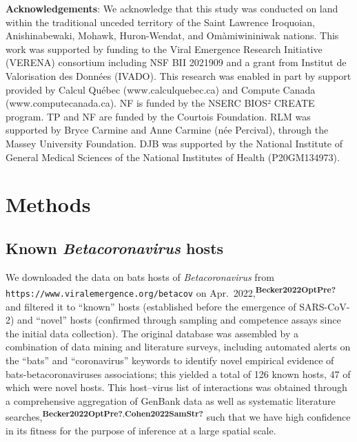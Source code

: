 \documentclass[10pt,oneside]{article}
\begin{document}
\textbf{Acknowledgements}: We acknowledge that this study was conducted
on land within the traditional unceded territory of the Saint Lawrence
Iroquoian, Anishinabewaki, Mohawk, Huron-Wendat, and Omàmiwininiwak
nations. This work was supported by funding to the Viral Emergence
Research Initiative (VERENA) consortium including NSF BII 2021909 and a
grant from Institut de Valorisation des Données (IVADO). This research
was enabled in part by support provided by Calcul Québec
(www.calculquebec.ca) and Compute Canada (www.computecanada.ca). NF is
funded by the NSERC BIOS² CREATE program. TP and NF are funded by the
Courtois Foundation. RLM was supported by Bryce Carmine and Anne Carmine
(née Percival), through the Massey University Foundation. DJB was
supported by the National Institute of General Medical Sciences of the
National Institutes of Health (P20GM134973).

\newpage

\hypertarget{methods}{%
\section{Methods}\label{methods}}

\hypertarget{known-betacoronavirus-hosts}{%
\subsection{\texorpdfstring{Known \emph{Betacoronavirus}
hosts}{Known Betacoronavirus hosts}}\label{known-betacoronavirus-hosts}}

We downloaded the data on bats hosts of \emph{Betacoronavirus} from
\texttt{https://www.viralemergence.org/betacov} on
Apr.~2022,\textsuperscript{\textbf{Becker2022OptPre?}} and filtered it
to ``known'' hosts (established before the emergence of SARS-CoV-2) and
``novel'' hosts (confirmed through sampling and competence assays since
the initial data collection). The original database was assembled by a
combination of data mining and literature surveys, including automated
alerts on the ``bats'' and ``coronavirus'' keywords to identify novel
empirical evidence of bats-betacoronaviruses associations; this yielded
a total of 126 known hosts, 47 of which were novel hosts. This
host--virus list of interactions was obtained through a comprehensive
aggregation of GenBank data as well as systematic literature
searches,\textsuperscript{\textbf{Becker2022OptPre?},\textbf{Cohen2022SamStr?}}
such that we have high confidence in its fitness for the purpose of
inference at a large spatial scale.
\end{document}

